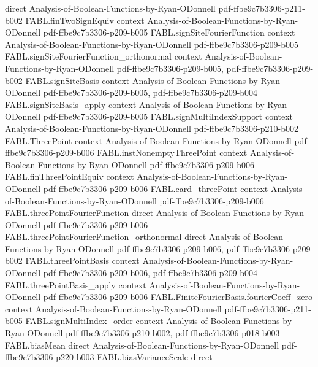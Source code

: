 \begin{theorem}
  {direct}
  {Analysis-of-Boolean-Functions-by-Ryan-ODonnell}
  {pdf-ffbe9c7b3306-p211-b002}
\proofstep
  {FABL.finTwoSignEquiv}
  {context}
  {Analysis-of-Boolean-Functions-by-Ryan-ODonnell}
  {pdf-ffbe9c7b3306-p209-b005}
\proofstep
  {FABL.signSiteFourierFunction}
  {context}
  {Analysis-of-Boolean-Functions-by-Ryan-ODonnell}
  {pdf-ffbe9c7b3306-p209-b005}
\proofstep
  {FABL.signSiteFourierFunction_orthonormal}
  {context}
  {Analysis-of-Boolean-Functions-by-Ryan-ODonnell}
  {pdf-ffbe9c7b3306-p209-b005,
    pdf-ffbe9c7b3306-p209-b002}
\proofstep
  {FABL.signSiteBasis}
  {context}
  {Analysis-of-Boolean-Functions-by-Ryan-ODonnell}
  {pdf-ffbe9c7b3306-p209-b005,
    pdf-ffbe9c7b3306-p209-b004}
\proofstep
  {FABL.signSiteBasis_apply}
  {context}
  {Analysis-of-Boolean-Functions-by-Ryan-ODonnell}
  {pdf-ffbe9c7b3306-p209-b005}
\proofstep
  {FABL.signMultiIndexSupport}
  {context}
  {Analysis-of-Boolean-Functions-by-Ryan-ODonnell}
  {pdf-ffbe9c7b3306-p210-b002}
\proofstep
  {FABL.ThreePoint}
  {context}
  {Analysis-of-Boolean-Functions-by-Ryan-ODonnell}
  {pdf-ffbe9c7b3306-p209-b006}
\proofstep
  {FABL.instNonemptyThreePoint}
  {context}
  {Analysis-of-Boolean-Functions-by-Ryan-ODonnell}
  {pdf-ffbe9c7b3306-p209-b006}
\proofstep
  {FABL.finThreePointEquiv}
  {context}
  {Analysis-of-Boolean-Functions-by-Ryan-ODonnell}
  {pdf-ffbe9c7b3306-p209-b006}
\proofstep
  {FABL.card_threePoint}
  {context}
  {Analysis-of-Boolean-Functions-by-Ryan-ODonnell}
  {pdf-ffbe9c7b3306-p209-b006}
\proofstep
  {FABL.threePointFourierFunction}
  {direct}
  {Analysis-of-Boolean-Functions-by-Ryan-ODonnell}
  {pdf-ffbe9c7b3306-p209-b006}
\proofstep
  {FABL.threePointFourierFunction_orthonormal}
  {direct}
  {Analysis-of-Boolean-Functions-by-Ryan-ODonnell}
  {pdf-ffbe9c7b3306-p209-b006,
    pdf-ffbe9c7b3306-p209-b002}
\proofstep
  {FABL.threePointBasis}
  {context}
  {Analysis-of-Boolean-Functions-by-Ryan-ODonnell}
  {pdf-ffbe9c7b3306-p209-b006,
    pdf-ffbe9c7b3306-p209-b004}
\proofstep
  {FABL.threePointBasis_apply}
  {context}
  {Analysis-of-Boolean-Functions-by-Ryan-ODonnell}
  {pdf-ffbe9c7b3306-p209-b006}
\proofstep
  {FABL.FiniteFourierBasis.fourierCoeff_zero}
  {context}
  {Analysis-of-Boolean-Functions-by-Ryan-ODonnell}
  {pdf-ffbe9c7b3306-p211-b005}
\proofstep
  {FABL.signMultiIndex_order}
  {context}
  {Analysis-of-Boolean-Functions-by-Ryan-ODonnell}
  {pdf-ffbe9c7b3306-p210-b002,
    pdf-ffbe9c7b3306-p018-b003}
\proofstep
  {FABL.biasMean}
  {direct}
  {Analysis-of-Boolean-Functions-by-Ryan-ODonnell}
  {pdf-ffbe9c7b3306-p220-b003}
\proofstep
  {FABL.biasVarianceScale}
  {direct}

\end{theorem}
